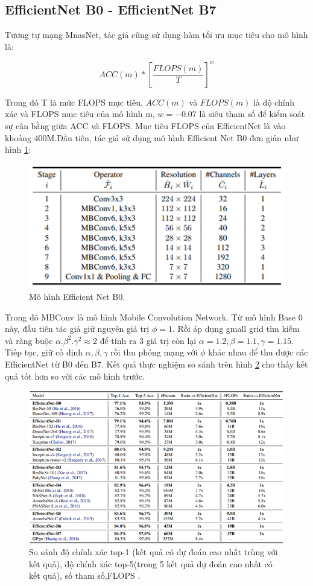 \subsection{EfficientNet B0 - EfficientNet B7}
Tương tự mạng MnasNet, tác giả cũng sử dụng hàm tối ưu mục tiêu cho mô hình là:\par
$$ACC(m)*\left[ \dfrac{FLOPS(m)}{T}\right]^w$$\par
Trong đó T là mức FLOPS mục tiêu, $ACC(m)$ và $FLOPS(m)$ là độ chính xác và FLOPS mục tiêu của mô hình m, $w = -0.07$ là siêu tham số để kiểm soát sự cân bằng giữa ACC và FLOPS. Mục tiêu FLOPS của EfficientNet là vào khoảng 400M.Đầu tiên, tác giả sử dụng mô hình Efficient Net B0 đơn giản như hình \ref{fig:eff5}:\par
\begin{figure}[ht!]
\centerline{\includegraphics[scale=0.6]{images/eff5.png}}
\caption{Mô hình Efficient Net B0\cite{efficientnet:2020}.}
\label{fig:eff5}
\end{figure}
Trong đó MBConv là mô hình Mobile Convolution Network. Từ mô hình Base 0 này, đầu tiên tác giả giữ nguyên giá trị $\phi=1$. Rồi áp dụng gmall grid tìm kiếm và ràng buộc $\alpha.\beta^2.\gamma^2\approx 2$ để tính ra 3 giá trị còn lại $\alpha=1.2, \beta=1.1, \gamma=1.15$. Tiếp tục, giữ cố định $\alpha,\beta,\gamma$ rồi thu phóng mạng với $\phi$ khác nhau để thu được các EfficientNet từ B0 đến B7. Kết quả thực nghiệm so sánh trên hình \ref{fig:eff6} cho thấy kết quả tốt hơn so với các mô hình trước.
\begin{figure}[ht!]
\centerline{\includegraphics[scale=0.6]{images/eff6.png}}
\caption{So sánh độ chính xác top-1 (kết quả có dự đoán cao nhất trùng với kết quả), độ chính xác top-5(trong 5 kết quả dự đoán cao nhất có kết quả), số tham số,FLOPS \cite{efficientnet:2020}.}
\label{fig:eff6}
\end{figure}
